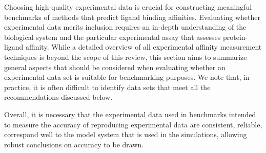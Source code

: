 \documentclass[9pt,bestpractices]{livecoms}
\begin{document}
Choosing high-quality experimental data is crucial for constructing meaningful benchmarks of methods that predict ligand binding affinities. 
Evaluating whether experimental data merits inclusion requires an in-depth understanding of the biological system and the particular experimental assay that assesses protein-ligand affinity.
While a detailed overview of all experimental affinity measurement techniques is beyond the scope of this review, this section aims to summarize general aspects that should be considered when evaluating whether an experimental data set is suitable for benchmarking purposes. 
We note that, in practice, it is often difficult to identify data sets that meet all the recommendations discussed below.

Overall, it is necessary that the experimental data used in benchmarks intended to measure the accuracy of reproducing experimental data are consistent, reliable, correspond well to the model system that is used in the simulations, allowing robust conclusions on accuracy to be drawn.
\end{document}
